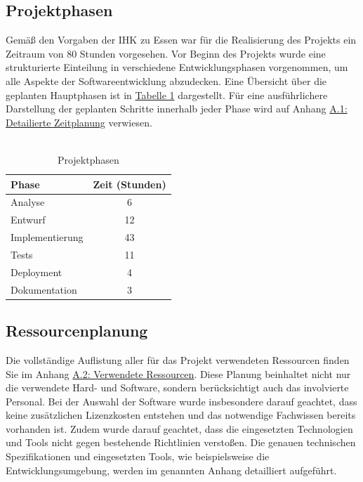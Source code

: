 \documentclass[a4paper,12pt]{article}
\begin{document}
\subsection{Projektphasen}
Gemäß den Vorgaben der IHK zu Essen war für die Realisierung des Projekts ein Zeitraum von 80 Stunden vorgesehen. Vor Beginn des Projekts wurde eine strukturierte Einteilung in verschiedene Entwicklungsphasen vorgenommen, um alle Aspekte der Softwareentwicklung abzudecken. Eine Übersicht über die geplanten Hauptphasen ist in  \hyperlink{Projektphasen}{Tabelle 1} dargestellt. Für eine ausführlichere Darstellung der geplanten Schritte innerhalb jeder Phase wird auf Anhang \hyperref[sec:detaillierte zeitplanung]{A.1: Detailierte Zeitplanung} verwiesen.\\
\\

\hypertarget{Projektphasen}{}
\begin{table}[h]
\centering
\begin{tabularx}{\textwidth}{|X|c|}
    \hline
    \rowcolor{gray}\textbf{Phase} & \textbf{Zeit (Stunden)} \\
    \hline
    Analyse & 6 \\
    \hline
    Entwurf & 12 \\
    \hline
    Implementierung & 43 \\
    \hline
    Tests & 11 \\
    \hline
    Deployment & 4 \\
    \hline
    Dokumentation & 3 \\
    \hline
\end{tabularx}
\caption{Projektphasen}
\label{tab:Projektphasen}
\end{table}

\subsection{Ressourcenplanung}
\label{sec:ressourcenplanung}
Die vollständige Auflistung aller für das Projekt verwendeten Ressourcen finden Sie im Anhang \hyperref[sec:ressourcen]{A.2: Verwendete Ressourcen}. Diese Planung beinhaltet nicht nur die verwendete Hard- und Software, sondern berücksichtigt auch das involvierte Personal. Bei der Auswahl der Software wurde insbesondere darauf geachtet, dass keine zusätzlichen Lizenzkosten entstehen und das notwendige Fachwissen bereits vorhanden ist. Zudem wurde darauf geachtet, dass die eingesetzten Technologien und Tools nicht gegen bestehende Richtlinien verstoßen. Die genauen technischen Spezifikationen und eingesetzten Tools, wie beispielsweise die Entwicklungsumgebung, werden im genannten Anhang detailliert aufgeführt.
\end{document}

